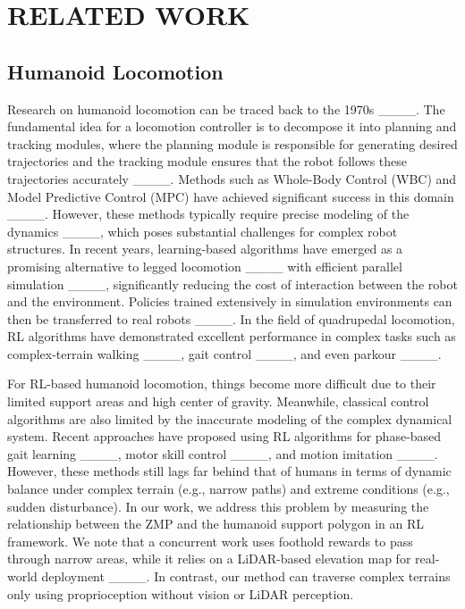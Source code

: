 \section{RELATED WORK}
\subsection{Humanoid Locomotion}

Research on humanoid locomotion can be traced back to the 1970s ____. The fundamental idea for a locomotion controller is to decompose it into planning and tracking modules, where the planning module is responsible for generating desired trajectories and the tracking module ensures that the robot follows these trajectories accurately ____. Methods such as Whole-Body Control (WBC) and Model Predictive Control (MPC) have achieved significant success in this domain ____. However, these methods typically require precise modeling of the dynamics ____, which poses substantial challenges for complex robot structures. In recent years, learning-based algorithms have emerged as a promising alternative to legged locomotion ____ with efficient parallel simulation ____, significantly reducing the cost of interaction between the robot and the environment. Policies trained extensively in simulation environments can then be transferred to real robots ____. In the field of quadrupedal locomotion, RL algorithms have demonstrated excellent performance in complex tasks such as complex-terrain walking ____, gait control ____, and even parkour ____. 

For RL-based humanoid locomotion, things become more difficult due to their limited support areas and high center of gravity. Meanwhile, classical control algorithms are also limited by the inaccurate modeling of the complex dynamical system. Recent approaches have proposed using RL algorithms for phase-based gait learning ____, motor skill control ____, and motion imitation ____. However, these methods still lags far behind that of humans in terms of dynamic balance under complex terrain (e.g., narrow paths) and extreme conditions (e.g., sudden disturbance). In our work, we address this problem by measuring the relationship between the ZMP and the humanoid support polygon in an RL framework. 
We note that a concurrent work uses foothold rewards to pass through narrow areas, while it relies on a LiDAR-based elevation map for real-world deployment ____. In contrast, our method can traverse complex terrains only using proprioception without vision or LiDAR perception.


